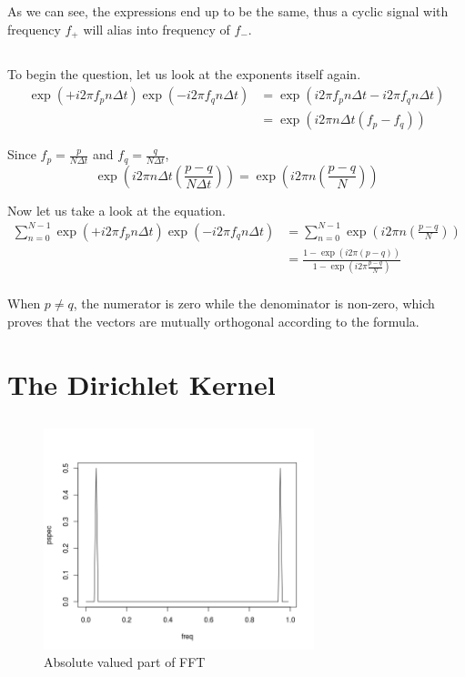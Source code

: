\documentclass[paper=a4, fontsize=11pt]{scrartcl}
\numberwithin{equation}{section} %
\numberwithin{figure}{section} %
\numberwithin{table}{section} %
\begin{document}
As we can see, the expressions end up to be the same, thus a cyclic signal with frequency $f_+$ will alias into frequency of $f_-$.
\subsection{}

To begin the question, let us look at the exponents itself again.
\begin{align*}
\exp(+i2\pi f_p n\Delta t) \exp(-i2\pi f_q n\Delta t) &= \exp(i2\pi f_p n\Delta t -i2\pi f_q n\Delta t) \\
&= \exp(i2\pi n\Delta t (f_p - f_q))
\end{align*}

Since $f_p = \frac{p}{N\Delta t}$ and $f_q = \frac{q}{N\Delta t}$,
$$\exp(i2\pi n\Delta t (\frac{p-q}{N\Delta t})) = \exp(i2\pi n (\frac{p-q}{N}))$$

Now let us take a look at the equation.
\begin{align*}
\sum^{N-1}_{n=0}\exp(+i2\pi f_p n\Delta t) \exp(-i2\pi f_q n\Delta t) &= \sum^{N-1}_{n=0}\exp(i2\pi n (\frac{p-q}{N}))\\
&= \frac{1-\exp(i2\pi (p-q))}{1-\exp(i2\pi\frac{p-q}{N})} \\
\end{align*}

When $p \neq q$, the numerator is zero while the denominator is non-zero, which proves that the vectors are mutually orthogonal according to the formula.


\section{The Dirichlet Kernel}

\subsection{}
\begin{figure}[htp]
	\centering
	\includegraphics[width=0.7\textwidth, clip]{q1aa.png} 
	\caption{Absolute valued part of FFT}
\end{figure}
\end{document}
